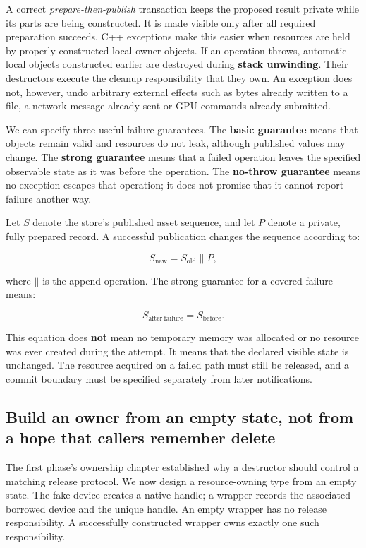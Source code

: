 A correct \emph{prepare-then-publish} transaction keeps the proposed result private while its parts are being constructed. It is made visible only after all required preparation succeeds. C++ exceptions make this easier when resources are held by properly constructed local owner objects. If an operation throws, automatic local objects constructed earlier are destroyed during \textbf{stack unwinding}. Their destructors execute the cleanup responsibility that they own. An exception does not, however, undo arbitrary external effects such as bytes already written to a file, a network message already sent or GPU commands already submitted.

We can specify three useful failure guarantees. The \textbf{basic guarantee} means that objects remain valid and resources do not leak, although published values may change. The \textbf{strong guarantee} means that a failed operation leaves the specified observable state as it was before the operation. The \textbf{no-throw guarantee} means no exception escapes that operation; it does not promise that it cannot report failure another way.

Let \(S\) denote the store's published asset sequence, and let \(P\) denote a private, fully prepared record. A successful publication changes the sequence according to:

\[
S_{\mathrm{new}} = S_{\mathrm{old}} \mathbin{\|} P,
\]

where \(\mathbin{\|}\) is the append operation. The strong guarantee for a covered failure means:

\[
S_{\mathrm{after\ failure}} = S_{\mathrm{before}}.
\]

This equation does \textbf{not} mean no temporary memory was allocated or no resource was ever created during the attempt. It means that the declared visible state is unchanged. The resource acquired on a failed path must still be released, and a commit boundary must be specified separately from later notifications.

\subsection{Build an owner from an empty state, not from a hope that callers remember delete}\label{05-engine-i-ch004-build-an-owner-from-an-empty-state-not-from-a-hope-that-callers-remember-delete}

The first phase's ownership chapter established why a destructor should control a matching release protocol. We now design a resource-owning type from an empty state. The fake device creates a native handle; a wrapper records the associated borrowed device and the unique handle. An empty wrapper has no release responsibility. A successfully constructed wrapper owns exactly one such responsibility.

